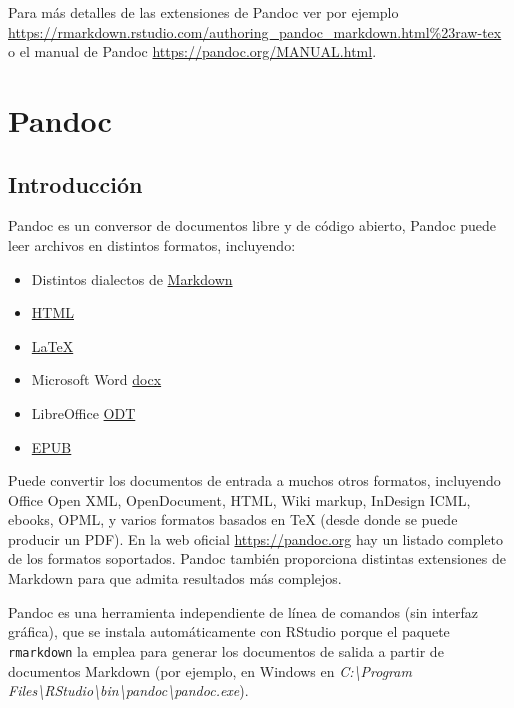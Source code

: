 \documentclass[]{book}
\theoremstyle{definition}
\theoremstyle{definition}
\theoremstyle{definition}
\theoremstyle{remark}
\begin{document}
Para más detalles de las extensiones de Pandoc ver por ejemplo
\url{https://rmarkdown.rstudio.com/authoring_pandoc_markdown.html\%23raw-tex}
o el manual de Pandoc \url{https://pandoc.org/MANUAL.html}.

\chapter{Pandoc}\label{pandoc}

\section{Introducción}\label{introduccion-2}

Pandoc es un conversor de documentos libre y de código abierto, Pandoc
puede leer archivos en distintos formatos, incluyendo:

\begin{itemize}
\item
  Distintos dialectos de
  \href{http://daringfireball.net/projects/markdown/}{Markdown}
\item
  \href{http://www.w3.org/TR/html40/}{HTML}
\item
  \href{http://www.latex-project.org/}{LaTeX}
\item
  Microsoft Word
  \href{https://en.wikipedia.org/wiki/Office_Open_XML}{docx}
\item
  LibreOffice \href{http://en.wikipedia.org/wiki/OpenDocument}{ODT}
\item
  \href{http://en.wikipedia.org/wiki/EPUB}{EPUB}
\end{itemize}

Puede convertir los documentos de entrada a muchos otros formatos,
incluyendo Office Open XML, OpenDocument, HTML, Wiki markup, InDesign
ICML, ebooks, OPML, y varios formatos basados en TeX (desde donde se
puede producir un PDF). En la web oficial \url{https://pandoc.org} hay
un listado completo de los formatos soportados. Pandoc también
proporciona distintas extensiones de Markdown para que admita resultados
más complejos.

Pandoc es una herramienta independiente de línea de comandos (sin
interfaz gráfica), que se instala automáticamente con RStudio porque el
paquete \texttt{rmarkdown} la emplea para generar los documentos de
salida a partir de documentos Markdown (por ejemplo, en Windows en
\emph{C:\textbackslash{}Program
Files\textbackslash{}RStudio\textbackslash{}bin\textbackslash{}pandoc\textbackslash{}pandoc.exe}).
\end{document}
